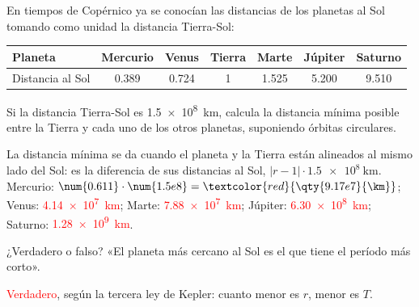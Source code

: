 \begin{exercise}
    En tiempos de Copérnico ya se conocían las distancias de los planetas al Sol tomando como unidad la distancia Tierra-Sol:
    \begin{center}
        \begin{tabular}{@{}lcccccc@{}}
            \toprule
            \textbf{Planeta} & \textbf{Mercurio} & \textbf{Venus} & \textbf{Tierra} & \textbf{Marte} & \textbf{Júpiter} & \textbf{Saturno} \\
            \midrule
            Distancia al Sol & \num{0.389} & \num{0.724} & 1 & \num{1.525} & \num{5.200} & \num{9.510} \\
            \bottomrule
        \end{tabular}
    \end{center}
    Si la distancia Tierra-Sol es \qty{1.5e8}{\km}, calcula la distancia mínima posible entre la Tierra y cada uno de los otros planetas, suponiendo órbitas circulares.
    \begin{solu}
        La distancia mínima se da cuando el planeta y la Tierra están alineados al mismo lado del Sol: es la diferencia de sus distancias al Sol, \(|r - 1| \cdot \num{1.5e8}~\unit{\km}\).
        Mercurio: \(\num{0.611} \cdot \num{1.5e8} = \textcolor{red}{\qty{9.17e7}{\km}}\); Venus: \textcolor{red}{\qty{4.14e7}{\km}}; Marte: \textcolor{red}{\qty{7.88e7}{\km}}; Júpiter: \textcolor{red}{\qty{6.30e8}{\km}}; Saturno: \textcolor{red}{\qty{1.28e9}{\km}}.
    \end{solu}
\end{exercise}

\begin{exercise}
    ¿Verdadero o falso? «El planeta más cercano al Sol es el que tiene el período más corto».
    \begin{solu}
        \textcolor{red}{Verdadero}, según la tercera ley de Kepler: cuanto menor es \(r\), menor es \(T\).
    \end{solu}
\end{exercise}

